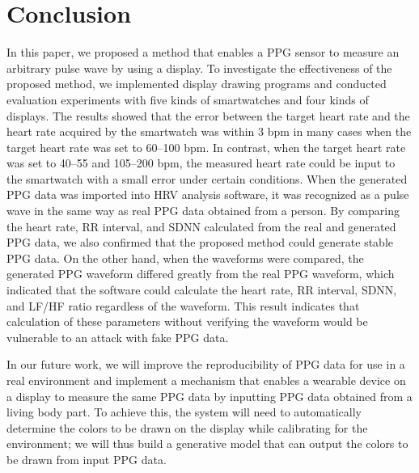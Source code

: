 \documentclass[manuscript,screen,review]{acmart}
\begin{document}
\section{Conclusion}
\label{sec:conclusion}
In this paper, we proposed a method that enables a PPG sensor to measure an arbitrary pulse wave by using a display. To investigate the effectiveness of the proposed method, we implemented display drawing programs and conducted evaluation experiments with five kinds of smartwatches and four kinds of displays. The results showed that the error between the target heart rate and the heart rate acquired by the smartwatch was within $3$ bpm in many cases when the target heart rate was set to 60--100 bpm. In contrast, when the target heart rate was set to 40--55 and 105--200 bpm, the measured heart rate could be input to the smartwatch with a small error under certain conditions. When the generated PPG data was imported into HRV analysis software, it was recognized as a pulse wave in the same way as real PPG data obtained from a person. By comparing the heart rate, RR interval, and SDNN calculated from the real and generated PPG data, we also confirmed that the proposed method could generate stable PPG data. On the other hand, when the waveforms were compared, the generated PPG waveform differed greatly from the real PPG waveform, which indicated that the software could calculate the heart rate, RR interval, SDNN, and LF/HF ratio regardless of the waveform. This result indicates that calculation of these parameters without verifying the waveform would be vulnerable to an attack with fake PPG data.\par

In our future work, we will improve the reproducibility of PPG data for use in a real environment and implement a mechanism that enables a wearable device on a display to measure the same PPG data by inputting PPG data obtained from a living body part. To achieve this, the system will need to automatically determine the colors to be drawn on the display while calibrating for the environment; we will thus build a generative model that can output the colors to be drawn from input PPG data.




\end{document}

